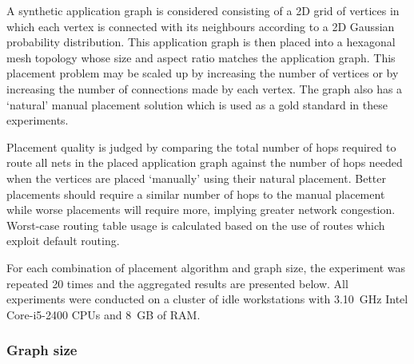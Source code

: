 			A synthetic application graph is considered consisting of a 2D grid of
			vertices in which each vertex is connected with its neighbours according
			to a 2D Gaussian probability distribution. This application graph is then
			placed into a hexagonal mesh topology whose size and aspect ratio matches
			the application graph. This placement problem may be scaled up by
			increasing the number of vertices or by increasing the number of
			connections made by each vertex. The graph also has a `natural' manual
			placement solution which is used as a gold standard in these experiments.
			
			Placement quality is judged by comparing the total number of hops
			required to route all nets in the placed application graph against the
			number of hops needed when the vertices are placed `manually' using their
			natural placement. Better placements should require a similar number of
			hops to the manual placement while worse placements will require more,
			implying greater network congestion. Worst-case routing table usage is
			calculated based on the use of routes which exploit default routing.
			
			For each combination of placement algorithm and graph size, the
			experiment was repeated 20 times and the aggregated results are presented
			below. All experiments were conducted on a cluster of idle workstations
			with 3.10~GHz Intel Core-i5-2400 CPUs and 8~GB of RAM.
			
			\subsubsection{Graph size}
				
